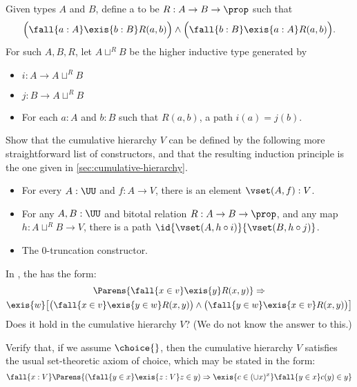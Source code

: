 \begin{ex}\label{ex:cumhierhit}
  Given types $A$ and $B$, define a 
  to be $R:A\to B\to \prop$ such that
  \[ \Big(\fall{a:A}\exis{b:B} R(a,b) \Big) \land \Big(\fall{b:B}\exis{a:A} R(a,b) \Big). \]
  For such $A,B,R$, let $A\sqcup^R B$ be the higher inductive type generated by
  \begin{itemize}
  \item $i:A\to A\sqcup^R B$
  \item $j:B\to A\sqcup^R B$
  \item For each $a:A$ and $b:B$ such that $R(a,b)$, a path $i(a)=j(b)$.
  \end{itemize}
  Show that the cumulative hierarchy $V$ can be defined by the following more straightforward list of constructors, and that the resulting induction principle is the one given in \cref{sec:cumulative-hierarchy}.
  \begin{itemize}
  \item For every $A : \UU$ and $f : A \to V$, there is an element $\vset(A, f) : V$.
  \item For any $A,B:\UU$ and bitotal relation
    $R:A\to B\to \prop$, and any map $h:A\sqcup^R B \to V$, there is a path $\id{\vset(A,h\circ i)}{\vset(B,h\circ j)}$.
  \item The 0-truncation constructor.
  \end{itemize}
\end{ex}

\begin{ex}\label{ex:strong-collection}
  In \CZF, the 
  has the form:
   \begin{multline*}
   \Parens{\fall{x\in v}\exis{y} R(x,y)} \Rightarrow \\
   \exis{w}\big[\big(\fall{x\in v}\exis{y\in w}R(x,y)\big)\land \big(\fall{y\in w}\exis{x\in v}R(x,y) \big)\big]
   \end{multline*}
   Does it hold in the cumulative hierarchy $V$?  (We do not know the answer to this.)
\end{ex}

\begin{ex}\label{ex:choice-cumulative-hierarchy-choice}
Verify that, if we assume $\choice{}$, then the cumulative hierarchy $V$ satisfies the usual set-theoretic axiom of choice, which may be stated in the form:
  \[
   \fall{x:V} \Parens{(\fall{y\in x}\exis{z:V} z\in y) \Rightarrow  \exis{c\in(\cup x)^x}\fall{y\in x} c(y)\in y}
   \]
\end{ex}

